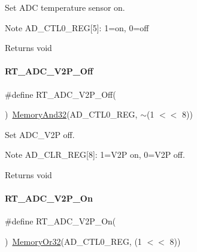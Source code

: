 Set A\+DC temperature sensor on. 

\begin{DoxyNote}{Note}
A\+D\+\_\+\+C\+T\+L0\+\_\+\+R\+EG\mbox{[}5\mbox{]}\+: 1=on, 0=off 
\end{DoxyNote}
\begin{DoxyReturn}{Returns}
void 
\end{DoxyReturn}
\mbox{\label{a00002_a392f47d863065820e42b66b84007dfe0}} 
\paragraph{\texorpdfstring{R\+T\+\_\+\+A\+D\+C\+\_\+\+V2\+P\+\_\+\+Off}{RT\_ADC\_V2P\_Off}}
{\footnotesize\ttfamily \#define R\+T\+\_\+\+A\+D\+C\+\_\+\+V2\+P\+\_\+\+Off(\begin{DoxyParamCaption}{ }\end{DoxyParamCaption})~\mbox{\hyperlink{a00020_ad87cedffcaadc51db22594fce55173d4}{Memory\+And32}}(A\+D\+\_\+\+C\+T\+L0\+\_\+\+R\+EG, $\sim$(1 $<$$<$ 8))}



Set A\+D\+C\+\_\+\+V2P off. 

\begin{DoxyNote}{Note}
A\+D\+\_\+\+C\+L\+R\+\_\+\+R\+EG\mbox{[}8\mbox{]}\+: 1=V2P on, 0=V2P off. 
\end{DoxyNote}
\begin{DoxyReturn}{Returns}
void 
\end{DoxyReturn}
\mbox{\label{a00002_af1002dc4b0d8af47aba6aaa5de06868e}} 
\paragraph{\texorpdfstring{R\+T\+\_\+\+A\+D\+C\+\_\+\+V2\+P\+\_\+\+On}{RT\_ADC\_V2P\_On}}
{\footnotesize\ttfamily \#define R\+T\+\_\+\+A\+D\+C\+\_\+\+V2\+P\+\_\+\+On(\begin{DoxyParamCaption}{ }\end{DoxyParamCaption})~\mbox{\hyperlink{a00020_a27874a97deab7cecdde5ddecf466e31e}{Memory\+Or32}}(A\+D\+\_\+\+C\+T\+L0\+\_\+\+R\+EG, (1 $<$$<$ 8))}



